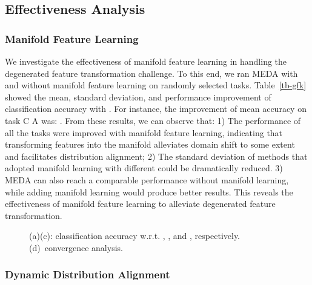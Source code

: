 \documentclass[sigconf]{acmart}
\begin{document}
\subsection{Effectiveness Analysis}

\subsubsection{Manifold Feature Learning} 
\label{sec-mani}
We investigate the effectiveness of manifold feature learning in handling the degenerated feature transformation challenge. To this end, we ran MEDA with and without manifold feature learning on randomly selected tasks. Table~\ref{tb-gfk} showed the mean, standard deviation, and performance improvement of classification accuracy with . For instance, the improvement of mean accuracy on task C  A was: . From these results, we can observe that: 1) The performance of all the tasks were improved with manifold feature learning, indicating that transforming features into the manifold alleviates domain shift to some extent and facilitates distribution alignment; 2) The standard deviation of methods that adopted manifold learning with different  could be dramatically reduced. 3) MEDA can also reach a comparable performance without manifold learning, while adding manifold learning would produce better results. This reveals the effectiveness of manifold feature learning to alleviate degenerated feature transformation. 

\begin{figure*}[t!]
	\centering
	\vspace{-.15in}
	\hspace{-.2in}
	\vspace{-.15in}
	\caption{(a)(c): classification accuracy w.r.t. , , and , respectively. (d)~convergence analysis.}
	\vspace{-.15in}
	\label{fig-p-d}
\end{figure*}

\subsubsection{Dynamic Distribution Alignment}
\end{document}
